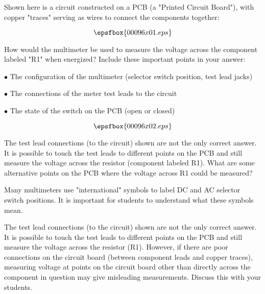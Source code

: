 

Shown here is a circuit constructed on a PCB (a "Printed Circuit Board"), with copper "traces" serving as wires to connect the components together:

$$\epsfbox{00096x01.eps}$$

How would the multimeter be used to measure the voltage across the component labeled "R1" when energized?  Include these important points in your answer:

\item {$\bullet$} The configuration of the multimeter (selector switch position, test lead jacks)
\item {$\bullet$} The connections of the meter test leads to the circuit
\item {$\bullet$} The state of the switch on the PCB (open or closed)







$$\epsfbox{00096x02.eps}$$

The test lead connections (to the circuit) shown are not the only correct answer.  It is possible to touch the test leads to different points on the PCB and still measure the voltage across the resistor (component labeled R1).  What are some alternative points on the PCB where the voltage across R1 could be measured?







Many multimeters use "international" symbols to label DC and AC selector switch positions.  It is important for students to understand what these symbols mean.

The test lead connections (to the circuit) shown are not the only correct answer.  It is possible to touch the test leads to different points on the PCB and still measure the voltage across the resistor (R1).  However, if there are poor connections on the circuit board (between component leads and copper traces), measuring voltage at points on the circuit board other than directly across the component in question may give misleading measurements.  Discuss this with your students.




